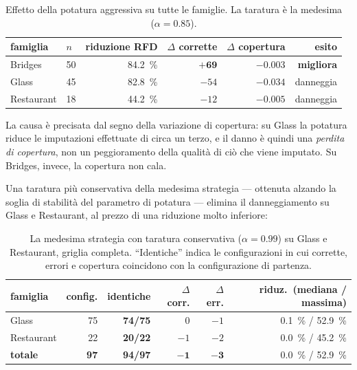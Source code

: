 \begin{table}[htbp]
\centering
\caption{Effetto della potatura aggressiva su tutte le famiglie. La taratura è la medesima
($\alpha = 0.85$).}
\label{tab:res-boundary}
\footnotesize
\begin{tabular}{llrrrr}
\toprule
famiglia & $n$ & riduzione RFD & $\Delta$ corrette & $\Delta$ copertura & esito \\
\midrule
Bridges    & 50 & \SI{84.2}{\percent} & $\mathbf{+69}$ & $-0.003$ & \textbf{migliora} \\
Glass      & 45 & \SI{82.8}{\percent} & $-54$          & $-0.034$ & danneggia \\
Restaurant & 18 & \SI{44.2}{\percent} & $-12$          & $-0.005$ & danneggia \\
\bottomrule
\end{tabular}
\end{table}

La causa è precisata dal segno della variazione di copertura: su Glass la potatura riduce le
imputazioni effettuate di circa un terzo, e il danno è quindi una \emph{perdita di copertura},
non un peggioramento della qualità di ciò che viene imputato. Su Bridges, invece, la copertura
non cala.

Una taratura più conservativa della medesima strategia --- ottenuta alzando la soglia di
stabilità del parametro di potatura --- elimina il danneggiamento su Glass e Restaurant, al
prezzo di una riduzione molto inferiore:

\begin{table}[htbp]
\centering
\caption{La medesima strategia con taratura conservativa ($\alpha = 0.99$) su Glass e Restaurant,
griglia completa. ``Identiche'' indica le configurazioni in cui corrette, errori e copertura
coincidono con la configurazione di partenza.}
\label{tab:res-gentle}
\footnotesize
\begin{tabular}{lrrrrr}
\toprule
famiglia & config. & identiche & $\Delta$ corr. & $\Delta$ err. & riduz.\ (mediana / massima) \\
\midrule
Glass      & 75 & \textbf{74/75} & 0   & $-1$ & \SI{0.1}{\percent} / \SI{52.9}{\percent} \\
Restaurant & 22 & \textbf{20/22} & $-1$ & $-2$ & \SI{0.0}{\percent} / \SI{45.2}{\percent} \\
\midrule
\textbf{totale} & \textbf{97} & \textbf{94/97} & $\mathbf{-1}$ & $\mathbf{-3}$ & \SI{0.0}{\percent} / \SI{52.9}{\percent} \\
\bottomrule
\end{tabular}
\end{table}

